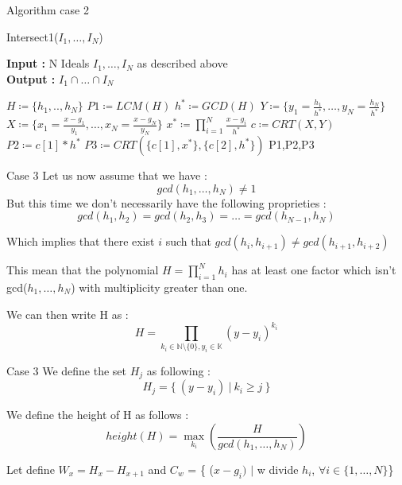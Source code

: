 \documentclass{beamer}
\begin{document}
\begin{frame}{Algorithm case 2}
    \begin{algorithm}[H]
    \caption{Intersect1($I_{1},\dots,I_{N}$)}\label{alg:intersect-n-ideals-equal-gcd}
    \textbf{Input : } N Ideals $I_{1},\dots,I_{N}$ as described above \\
    \textbf{Output : }$I_{1} \cap \dots\cap I_ {N}$
\begin{algorithmic}
    \State $H \coloneqq \{h_{1},..,h_{N}\}$
    \State $P1 \coloneqq LCM(H)$
    \State $h^{*} \coloneqq GCD(H)$
    \State $Y\coloneqq \{y_{1}= \frac{h_{1}}{h^{*}},\dots,y_{N}= \frac{h_{N}}{h^{*}}\}$
    \State $X \coloneqq \{x_{1} = \frac{x-g_{1}}{y_{1}},\dots,x_{N} =\frac{x-g_{N}}{y_{N}}\}$
    \State $x^{*} \coloneqq \prod^{N}_{i=1} \frac{x-g_{i}}{h^{*}}$
    \State $c\coloneqq CRT(X,Y)$
    \State $P2 \coloneqq c[1]*h^{*}$ 
    \State $P3 \coloneqq CRT(\{c[1],x^{*}\},\{c[2], h^{*}\})$
    \State \Return P1,P2,P3
\end{algorithmic}
\end{algorithm}
\end{frame}

\begin{frame}{Case 3}
Let us now assume that we have :
\[gcd(h_{1},\dots,h_{N}) \neq 1\]
But this time we don't necessarily have the following proprieties :
\[gcd(h_{1},h_{2}) = gcd(h_{2},h_{3}) = \dots = gcd(h_{N-1},h_{N}) \]

Which implies that there exist $i$ such that $gcd(h_{i},h_{i+1}) \neq gcd(h_{i+1},h_{i+2})$

This mean that the polynomial $H = \prod_{i=1}^{N} h_{i}$ has at least one factor which isn't gcd($h_{1},\dots,h_{N}$) with multiplicity greater than one.

We can then write H as :
\[H=\prod_{k_{i} \in \mathbb{N}
 \setminus \{0\}, y_{i}\in \mathbb{K}} (y-y_{i})^{k_{i}}\]

\end{frame}

\begin{frame}{Case 3}
    We define the set $H_{j}$ as following :
\[H_{j} = \{\ (y-y_{i}) \ |\  k_{i} \geq j\ \}\]

We define the height of H as follows : \[height(H) = \max_{k_{i}}(\frac{H}{gcd(h_{1},\dots,h_{N})})\]

Let define $W_{x} = H_{x}-H_{x+1}$ and $C_{w}$ = \{ ($x-g_{i})$ $|$ w divide $h_{i}$, $\forall i \in \{1,\dots,N\}$\}\newline
\end{frame}
\end{document}
